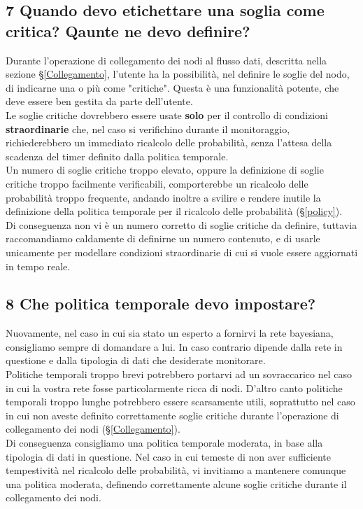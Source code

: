 \subsection*{7 Quando devo etichettare una soglia come critica? Qaunte ne devo definire?}
Durante l'operazione di collegamento dei nodi al flusso dati, descritta nella sezione §\ref{Collegamento}, l'utente ha la possibilità, nel definire le soglie del nodo, di indicarne una o più come "critiche". Questa è una funzionalità potente, che deve essere ben gestita da parte dell'utente.\\
Le soglie critiche dovrebbero essere usate \textbf{solo} per il controllo di condizioni \textbf{straordinarie} che, nel caso si verifichino durante il monitoraggio, richiederebbero un immediato ricalcolo delle probabilità, senza l'attesa della scadenza del timer definito dalla politica temporale.\\
Un numero di soglie critiche troppo elevato, oppure la definizione di soglie critiche troppo facilmente verificabili, comporterebbe un ricalcolo delle probabilità troppo frequente, andando inoltre a svilire e rendere inutile la definizione della politica temporale per il ricalcolo delle probabilità (§\ref{policy}).\\
Di conseguenza non vi è un numero corretto di soglie critiche da definire, tuttavia raccomandiamo caldamente di definirne un numero contenuto, e di usarle unicamente per modellare condizioni straordinarie di cui si vuole essere aggiornati in tempo reale.

\subsection*{8 Che politica temporale devo impostare?}
Nuovamente, nel caso in cui sia stato un esperto a fornirvi la rete bayesiana, consigliamo sempre di domandare a lui. In caso contrario dipende dalla rete in questione e dalla tipologia di dati che desiderate monitorare.\\
Politiche temporali troppo brevi potrebbero portarvi ad un sovraccarico nel caso in cui la vostra rete fosse particolarmente ricca di nodi. D'altro canto politiche temporali troppo lunghe potrebbero essere scarsamente utili, soprattutto nel caso in cui non aveste definito correttamente soglie critiche durante l'operazione di collegamento dei nodi (§\ref{Collegamento}).\\
Di conseguenza consigliamo una politica temporale moderata, in base alla tipologia di dati in questione. Nel caso in cui temeste di non aver sufficiente tempestività nel ricalcolo delle probabilità, vi invitiamo a mantenere comunque una politica moderata, definendo correttamente alcune soglie critiche durante il collegamento dei nodi.

